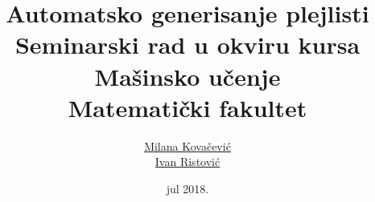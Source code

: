 \documentclass[a4paper]{article}
\theoremstyle{plain}
\theoremstyle{definition}
\begin{document}
\title{Automatsko generisanje plejlisti\\ \small{Seminarski rad u okviru kursa\\Ma\v{s}insko u\v{c}enje\\ Matematički fakultet}}

\author{\href{mailto:mi14031@matf.bg.ac.rs}{Milana Kova\v{c}evi\'c}\\\href{mailto:mi14042@matf.bg.ac.rs}{Ivan Ristovi\'c}}
\date{jul 2018.}

\maketitle



\tableofcontents

\newpage






\newpage

%
\end{document}
